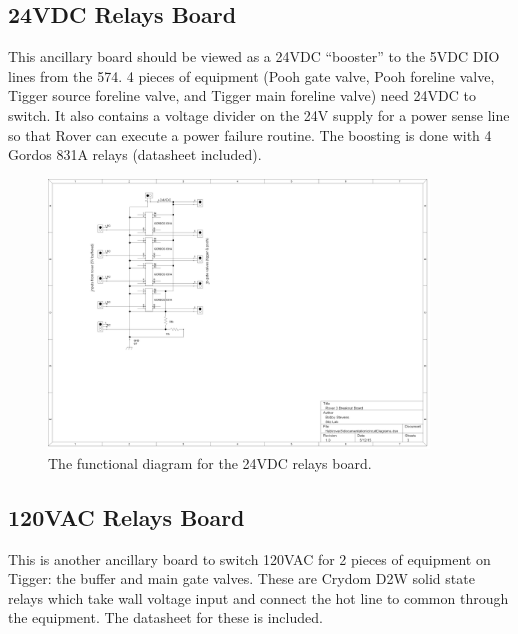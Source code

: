 \documentclass{article}
\begin{document}
\subsection{24VDC Relays Board}
This ancillary board should be viewed as a 24VDC ``booster'' to the 5VDC DIO lines from the 574. 4 pieces of equipment (Pooh gate valve, Pooh foreline valve, Tigger source foreline valve, and Tigger main foreline valve) need 24VDC to switch. It also contains a voltage divider on the 24V supply for a power sense line so that Rover can execute a power failure routine. The boosting is done with 4 Gordos 831A relays (datasheet included). 

\begin{figure}
\centering
\includegraphics[width=0.9\textwidth]{24VDCBreakout.png}
\caption{The functional diagram for the 24VDC relays board.}
\label{fig:24VDCBreakout}
\end{figure}


\subsection{120VAC Relays Board}
This is another ancillary board to switch 120VAC for 2 pieces of equipment on Tigger: the buffer and main gate valves. These are Crydom D2W solid state relays which take wall voltage input and connect the hot line to common through the equipment. The datasheet for these is included.
\end{document}
